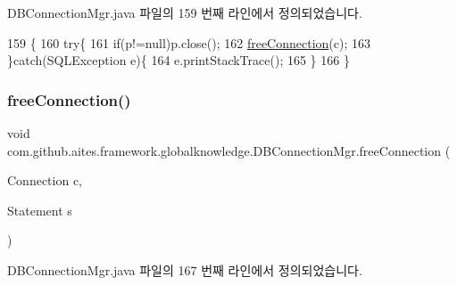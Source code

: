 D\+B\+Connection\+Mgr.\+java 파일의 159 번째 라인에서 정의되었습니다.


\begin{DoxyCode}
159                                                                  \{
160         \textcolor{keywordflow}{try}\{
161             \textcolor{keywordflow}{if}(p!=null)p.close();
162             \mbox{\hyperlink{classcom_1_1github_1_1aites_1_1framework_1_1globalknowledge_1_1_d_b_connection_mgr_a4c1302a674f9c74b55f6fae96bf79b64}{freeConnection}}(c);
163         \}\textcolor{keywordflow}{catch}(SQLException e)\{
164             e.printStackTrace();
165         \}
166     \}
\end{DoxyCode}
\mbox{\label{classcom_1_1github_1_1aites_1_1framework_1_1globalknowledge_1_1_d_b_connection_mgr_a437d75014e39b55db0482e8988db054d}} 
\subsubsection{\texorpdfstring{free\+Connection()}{freeConnection()}\hspace{0.1cm}{\footnotesize\ttfamily [5/5]}}
{\footnotesize\ttfamily void com.\+github.\+aites.\+framework.\+globalknowledge.\+D\+B\+Connection\+Mgr.\+free\+Connection (\begin{DoxyParamCaption}\item[{Connection}]{c,  }\item[{Statement}]{s }\end{DoxyParamCaption})}



D\+B\+Connection\+Mgr.\+java 파일의 167 번째 라인에서 정의되었습니다.


